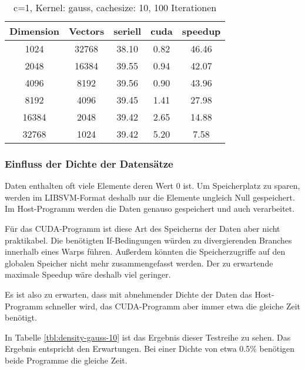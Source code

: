 \documentclass[ngerman]{scrartcl}
\begin{document}
\begin{table}
\begin{center}
\begin{tabular}{|c|c|c|c|c|}
\hline
Dimension & Vectors & seriell & cuda & speedup \\
\hline
1024 & 32768 & 38.10 & 0.82 & 46.46 \\
2048 & 16384 & 39.55 & 0.94 & 42.07 \\
4096 & 8192 & 39.56 & 0.90 & 43.96 \\
8192 & 4096 & 39.45 & 1.41 & 27.98 \\
16384 & 2048 & 39.42 & 2.65 & 14.88 \\
32768 & 1024 & 39.42 & 5.20 & 7.58 \\
\hline
\end{tabular}
\end{center}
\caption{ c=1, Kernel: gauss, cachesize: 10, 100 Iterationen}
\label{tbl:ratio-gauss-10}
\end{table}

\subsubsection{Einfluss der Dichte der Datensätze}
Daten enthalten oft viele Elemente deren Wert $0$ ist. Um Speicherplatz zu sparen, werden im LIBSVM-Format deshalb nur die Elemente ungleich Null gespeichert. Im Host-Programm werden die Daten genauso gespeichert und auch verarbeitet.

Für das CUDA-Programm ist diese Art des Speicherns der Daten aber nicht praktikabel. Die benötigten If-Bedingungen würden zu divergierenden Branches innerhalb eines Warps führen. 
Außerdem könnten die Speicherzugriffe auf den globalen Speicher nicht mehr zusammengefasst werden. Der zu erwartende maximale Speedup wäre deshalb viel geringer.

Es ist also zu erwarten, dass mit abnehmender Dichte der Daten das Host-Programm schneller wird, das CUDA-Programm aber immer etwa die gleiche Zeit benötigt. 

In Tabelle \ref{tbl:density-gauss-10} ist das Ergebnis dieser Testreihe zu sehen. Das Ergebnis entspricht den Erwartungen. 
Bei einer Dichte von etwa 0.5\%  benötigen beide Programme die gleiche Zeit.



\end{document}
